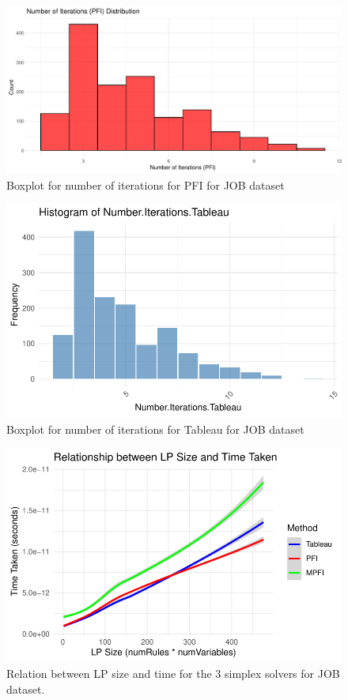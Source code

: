 \begin{figure}[!htb]
    \centering
    \includegraphics[width=\textwidth]{figures/histo_iter_pfi.pdf}
    \caption{Boxplot for number of iterations for PFI for JOB dataset}
    \label{fig:num_iter_boxplot_pfi_job}
\end{figure}

\begin{figure}[!htb]
    \centering
    \includegraphics[width=\textwidth]{figures/histogram_iter_tableau.pdf}
    \caption{Boxplot for number of iterations for Tableau for JOB dataset}
    \label{fig:num_iter_boxplot_tableau_job}
\end{figure}


\begin{figure}[!htb]
    \centering
    \includegraphics[width=\textwidth]{figures/lp_size_vs_time_job.pdf}
    \caption{Relation between LP size and time for the 3 simplex solvers for JOB dataset.}
    \label{fig:lp_size_vs_time_job}
\end{figure}

